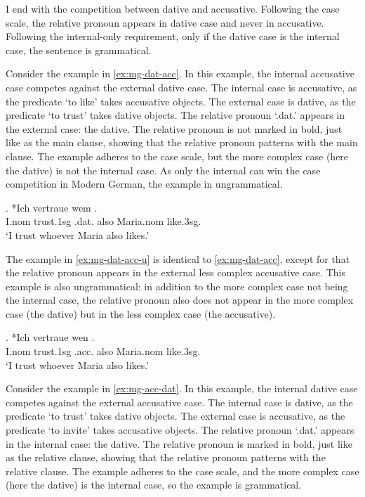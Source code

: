 I end with the competition between dative and accusative. Following the case scale, the relative pronoun appears in dative case and never in accusative. Following the internal-only requirement, only if the dative case is the internal case, the sentence is grammatical.

Consider the example in \ref{ex:mg-dat-acc}. In this example, the internal accusative case competes against the external dative case.
The internal case is accusative, as the predicate  `to like' takes accusative objects.
The external case is dative, as the predicate  `to trust' takes dative objects.
The relative pronoun  `.\ac{dat}.' appears in the external case: the dative. The relative pronoun is not marked in bold, just like as the main clause, showing that the relative pronoun patterns with the main clause.
The example adheres to the case scale, but the more complex case (here the dative) is not the internal case. As only the internal can win the case competition in Modern German, the example in ungrammatical.

\exg. *Ich vertraue wem   . \\
I.\ac{nom} trust.1\ac{sg}\scsub{[dat]} .\ac{dat}. also Maria.\ac{nom} like.3\ac{sg}\scsub{[acc]}.\\
`I trust whoever Maria also likes.' \label{ex:mg-dat-acc}

The example in \ref{ex:mg-dat-acc-u} is identical to \ref{ex:mg-dat-acc}, except for that the relative pronoun appears in the external less complex accusative case. This example is also ungrammatical: in addition to the more complex case not being the internal case, the relative pronoun also does not appear in the more complex case (the dative) but in the less complex case (the accusative).

\exg. *Ich vertraue wen   . \\
I.\ac{nom} trust.1\ac{sg}\scsub{[dat]} .\ac{acc}. also Maria.\ac{nom} like.3\ac{sg}\scsub{[acc]}.\\
`I trust whoever Maria also likes.' \label{ex:mg-dat-acc-u}

Consider the example in \ref{ex:mg-acc-dat}. In this example, the internal dative case competes against the external accusative case.
The internal case is dative, as the predicate  `to trust' takes dative objects.
The external case is accusative, as the predicate  `to invite' takes accusative objects.
The relative pronoun  `.\ac{dat}.' appears in the internal case: the dative. The relative pronoun is marked in bold, just like as the relative clause, showing that the relative pronoun patterns with the relative clause.
The example adheres to the case scale, and the more complex case (here the dative) is the internal case, so the example is grammatical.

